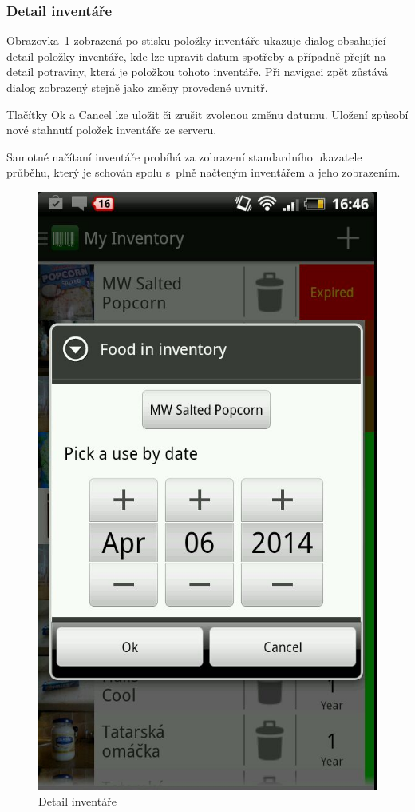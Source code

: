 \documentclass[thesis=B,czech]{FITthesis}[2013/10/20]
\begin{document}
\clearpage

\subsubsection{Detail inventáře}

Obrazovka~\ref{fig:AppInventoryDetail} zobrazená po stisku položky inventáře ukazuje dialog obsahující detail položky inventáře, kde lze upravit datum spotřeby a případně přejít na detail potraviny, která je položkou tohoto inventáře. Při navigaci zpět zůstává dialog zobrazený stejně jako změny provedené uvnitř.

Tlačítky Ok a Cancel lze uložit či zrušit zvolenou změnu datumu. Uložení způsobí nové stahnutí položek inventáře ze serveru.

Samotné načítaní inventáře probíhá za zobrazení standardního ukazatele průběhu, který je schován spolu s~plně načteným inventářem a jeho zobrazením.

\begin{figure}[H]
  \centering
  \includegraphics[scale=0.4]{screenshots/app_inventory_detail.jpg}
  \caption{Detail inventáře}
  \label{fig:AppInventoryDetail}
\end{figure}
\end{document}
